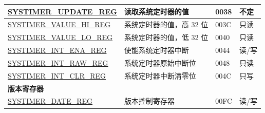 \begin{longtable}{ | p{6cm} | p{7.2cm} | p{1.3cm} | p{1cm} | }
\hyperref[regdesc:SYSTIMERUPDATEREG]{SYSTIMER\_UPDATE\_REG} & 读取系统定时器的值 & \hexprefix{}0038 & 不定 \\ \hline
\hyperref[regdesc:SYSTIMERVALUEHIREG]{SYSTIMER\_VALUE\_HI\_REG} & 系统定时器的值，高 32 位 & \hexprefix{}003C & 只读 \\ \hline
\hyperref[regdesc:SYSTIMERVALUELOREG]{SYSTIMER\_VALUE\_LO\_REG} & 系统定时器的值，低 32 位 & \hexprefix{}0040 & 只读 \\ \hline
\hyperref[regdesc:SYSTIMERINTENAREG]{SYSTIMER\_INT\_ENA\_REG} & 使能系统定时器中断 & \hexprefix{}0044 & 读/写 \\ \hline
\hyperref[regdesc:SYSTIMERINTRAWREG]{SYSTIMER\_INT\_RAW\_REG} & 系统定时器原始中断位 & \hexprefix{}0048 & 只读 \\ \hline
\hyperref[regdesc:SYSTIMERINTCLRREG]{SYSTIMER\_INT\_CLR\_REG} & 系统定时器中断清零位 & \hexprefix{}004C & 只写 \\ \hline
\multicolumn{4}{|l|}{\textbf{版本寄存器}} \\ \hline
\hyperref[regdesc:SYSTIMERDATEREG]{SYSTIMER\_DATE\_REG} & 版本控制寄存器 & \hexprefix{}00FC & 读/写 \\ \hline
\end{longtable}
